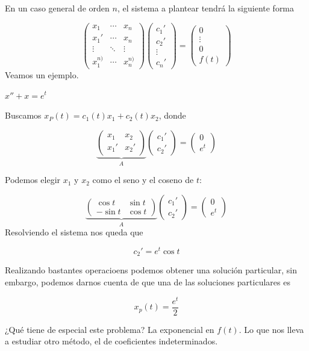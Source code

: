 En un caso general de orden $n$, el sistema a plantear tendrá la siguiente forma

\[ \begin{pmatrix}
x_1 & \cdots & x_n \\
x_1' & \cdots & x_n \\
\vdots & \ddots & \vdots \\
x_1^{n)} & \cdots & x_n^{n)}
\end{pmatrix} \begin{pmatrix} c_1' \\ c_2' \\ \vdots \\ c_n' \end{pmatrix} 
= 
\begin{pmatrix}
0 \\ \vdots \\ 0 \\ f(t)
\end{pmatrix} \]
Veamos un ejemplo.

\begin{example}
$x'' + x = e^t$

Buscamos $x_P(t) = c_1(t) x_1 + c_2(t) x_2$, donde

\[ \underbrace{\begin{pmatrix}
x_1 & x_2 \\
x_1' & x_2' 
\end{pmatrix}}_A\begin{pmatrix}
c_1' \\ c_2'
\end{pmatrix} = \begin{pmatrix}
0 \\ e^t
\end{pmatrix} \] 

Podemos elegir $x_1$ y $x_2$ como el seno y el coseno de $t$:

\[ \underbrace{\begin{pmatrix}
\cos t & \sin t \\
- \sin t & \cos t 
\end{pmatrix}}_A\begin{pmatrix}
c_1' \\ c_2'
\end{pmatrix} = \begin{pmatrix}
0 \\ e^t
\end{pmatrix} \] 
Resolviendo el sistema nos queda que 

\[ c_2' = e^t \cos t \]

Realizando bastantes operacioens podemos obtener una solución particular, sin embargo, podemos darnos cuenta de que una de las soluciones particulares es

\[ x_p(t) = \frac{e^t}{2} \]

¿Qué tiene de especial este problema? La exponencial en $f(t)$. Lo que nos lleva a estudiar otro método, el de coeficientes indeterminados.
\end{example}


